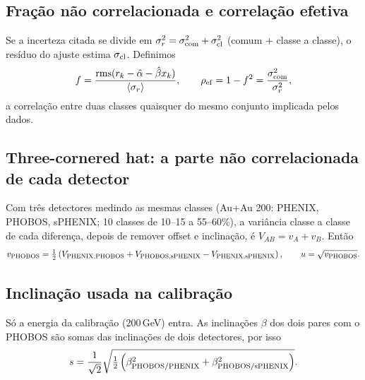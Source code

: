 \documentclass[11pt,a4paper]{article}
\begin{document}
\subsection{Fração não correlacionada e correlação efetiva}
Se a incerteza citada se divide em $\sigma_r^2=\sigma^2_{\rm com}+\sigma^2_{\rm cl}$ (comum + classe a classe), o resíduo
do ajuste estima $\sigma_{\rm cl}$. Definimos
\begin{equation}
f=\frac{\mathrm{rms}(r_k-\hat\alpha-\hat\beta x_k)}{\langle\sigma_{r}\rangle},\qquad
\rho_{\rm ef}=1-f^2=\frac{\sigma^2_{\rm com}}{\sigma_r^2},
\end{equation}
a correlação entre duas classes quaisquer do mesmo conjunto implicada pelos dados.

\subsection{Three-cornered hat: a parte não correlacionada de cada detector}
Com três detectores medindo as mesmas classes (Au+Au 200: PHENIX, PHOBOS, sPHENIX; 10 classes de 10--15 a 55--60\%), a
variância classe a classe de cada diferença, depois de remover offset e inclinação, é $V_{AB}=v_A+v_B$. Então
\begin{equation}
v_{\rm PHOBOS}=\tfrac12\left(V_{\rm PHENIX,PHOBOS}+V_{\rm PHOBOS,sPHENIX}-V_{\rm PHENIX,sPHENIX}\right),\qquad u=\sqrt{v_{\rm PHOBOS}} .
\end{equation}

\subsection{Inclinação usada na calibração}
Só a energia da calibração (200\,GeV) entra. As inclinações $\beta$ dos dois pares com o PHOBOS são somas das inclinações
de dois detectores, por isso
\begin{equation}
s=\frac{1}{\sqrt2}\sqrt{\tfrac12\left(\beta^2_{\rm PHOBOS/PHENIX}+\beta^2_{\rm PHOBOS/sPHENIX}\right)} .
\end{equation}
\end{document}
